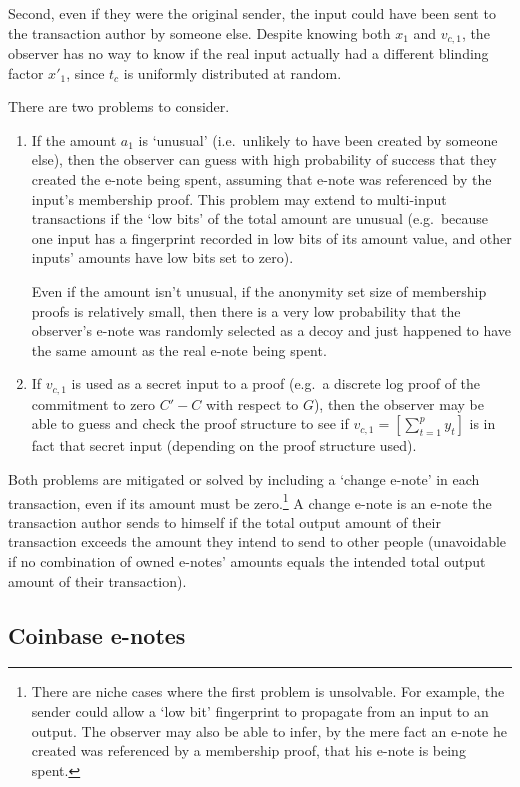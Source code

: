 Second, even if they were the original sender, the input could have been sent to the transaction author by someone else. Despite knowing both $x_1$ and $v_{c,1}$, the observer has no way to know if the real input actually had a different blinding factor $x'_1$, since $t_c$ is uniformly distributed at random.

There are two problems to consider.
\begin{enumerate}
    \item If the amount $a_1$ is `unusual' (i.e.\ unlikely to have been created by someone else), then the observer can guess with high probability of success that they created the e-note being spent, assuming that e-note was referenced by the input's membership proof. This problem may extend to multi-input transactions if the `low bits' of the total amount are unusual (e.g.\ because one input has a fingerprint recorded in low bits of its amount value, and other inputs' amounts have low bits set to zero).

    Even if the amount isn't unusual, if the anonymity set size of membership proofs is relatively small, then there is a very low probability that the observer's e-note was randomly selected as a decoy and just happened to have the same amount as the real e-note being spent.

    \item If $v_{c,1}$ is used as a secret input to a proof (e.g.\ a discrete log proof of the commitment to zero $C' - C$ with respect to $G$), then the observer may be able to guess and check the proof structure to see if $v_{c,1} = [\sum^{p}_{t=1} y_t]$ is in fact that secret input (depending on the proof structure used).
\end{enumerate}

Both problems are mitigated or solved by including a `change e-note' in each transaction, even if its amount must be zero.\footnote{There are niche cases where the first problem is unsolvable. For example, the sender could allow a `low bit' fingerprint to propagate from an input to an output. The observer may also be able to infer, by the mere fact an e-note he created was referenced by a membership proof, that his e-note is being spent.} A change e-note is an e-note the transaction author sends to himself if the total output amount of their transaction exceeds the amount they intend to send to other people (unavoidable if no combination of owned e-notes' amounts equals the intended total output amount of their transaction).


\subsection{Coinbase e-notes}
\label{subsec:implementers-coinbase-enotes}

